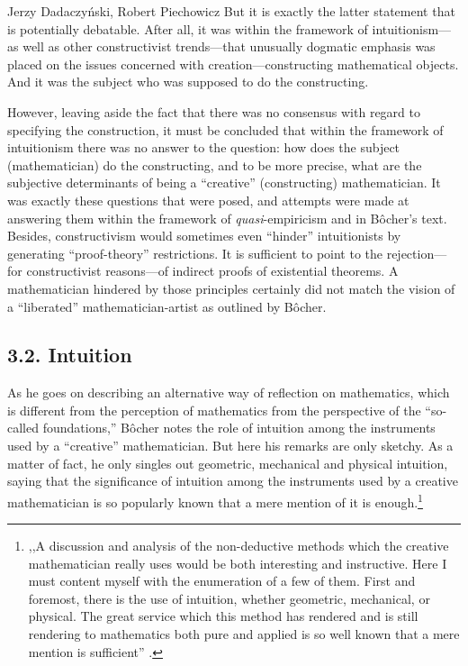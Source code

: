 \begin{artengenv}{Jerzy Dadaczyński, Robert Piechowicz}
But it is exactly the latter statement that is potentially debatable. After all, it was within the framework of intuitionism---as well as other constructivist trends---that unusually dogmatic emphasis was placed on the issues concerned with creation---constructing mathematical objects. And it was the subject who was supposed to do the constructing.

However, leaving aside the fact that there was no consensus with regard to specifying the construction, it must be concluded that within the framework of intuitionism there was no answer to the question: how does the subject (mathematician) do the constructing, and to be more precise, what are the subjective determinants of being a ``creative'' (constructing) mathematician. It was exactly these questions that were posed, and attempts were made at answering them within the framework of \textit{quasi}-empiricism and in Bôcher's text. Besides, constructivism would sometimes even ``hinder'' intuitionists by generating ``proof-theory'' restrictions. It is sufficient to point to the rejection---for constructivist reasons---of indirect proofs of existential theorems. A mathematician hindered by those principles certainly did not match the vision of a ``liberated'' mathematician-artist as outlined by Bôcher.

\subsection{3.2. Intuition}

As he goes on describing an alternative way of reflection on mathematics, which is different from the perception of mathematics from the perspective of the ``so-called foundations,'' Bôcher notes the role of intuition among the instruments used by a ``creative'' mathematician. But here his remarks are only sketchy. As a matter of fact, he only singles out geometric, mechanical and physical intuition, saying that the significance of intuition among the instruments used by a creative mathematician is so popularly known that a mere mention of it is enough.\footnote{,,A discussion and analysis of the non-deductive methods which the creative mathematician really uses would be both interesting and instructive. Here I must content myself with the enumeration of a few of them. First and foremost, there is the use of intuition, whether geometric, mechanical, or physical. The great service which this method has rendered and is still rendering to mathematics both pure and applied is so well known that a mere mention is sufficient''
\parencite[][p.134]{bocher_fundamental_1904}.%
}


\end{artengenv}
